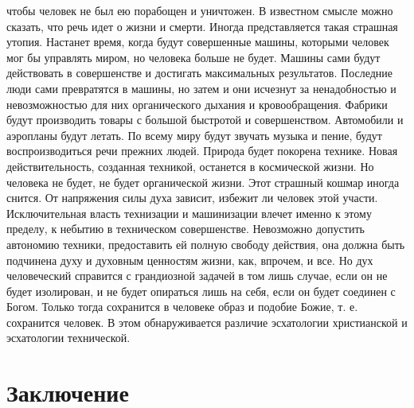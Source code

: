 чтобы человек не был ею порабощен и уничтожен. В известном смысле можно 
сказать, что речь идет о жизни и смерти. Иногда представляется такая страшная 
утопия. Настанет время, когда будут совершенные машины, которыми человек мог 
бы управлять миром, но человека больше не будет. Машины сами будут 
действовать в совершенстве и достигать максимальных результатов. Последние 
люди сами превратятся в машины, но затем и они исчезнут за ненадобностью и 
невозможностью для них органического дыхания и кровообращения. Фабрики будут 
производить товары с большой быстротой и совершенством. Автомобили и аэропланы 
будут летать. По всему миру будут звучать музыка и пение, будут 
воспроизводиться речи прежних людей. Природа будет покорена технике. Новая 
действительность, созданная техникой, останется в космической жизни. Но 
человека не будет, не будет органической жизни. Этот страшный кошмар иногда 
снится. От напряжения силы духа зависит, избежит ли человек этой участи. 
Исключительная власть технизации и машинизации влечет именно к этому пределу, 
к небытию в техническом совершенстве. Невозможно допустить автономию техники, 
предоставить ей полную свободу действия, она должна быть подчинена духу и 
духовным ценностям жизни, как, впрочем, и все. Но дух человеческий справится с 
грандиозной задачей в том  лишь случае, если он не будет изолирован, и не 
будет опираться лишь на себя, если он будет соединен с Богом. Только тогда 
сохранится в человеке образ и подобие Божие, т. е. сохранится человек. В этом 
обнаруживается различие эсхатологии христианской и эсхатологии технической. 
\cite{bib:01}

\section{Заключение}

\newpage